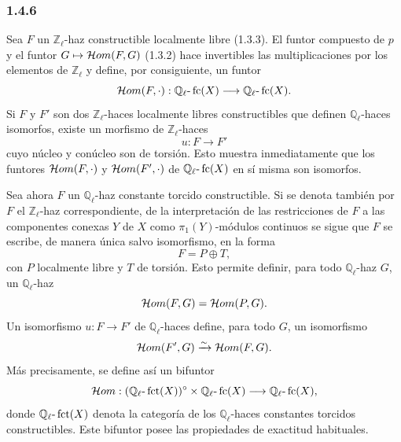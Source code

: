 \subsubsection*{1.4.6}
Sea \(F\) un \(\mathbb Z_\ell\)-haz constructible localmente libre (1.3.3). El funtor compuesto de \(p\) y el funtor \(G\mapsto\mathcal{H}om(F,G)\) (1.3.2) hace invertibles las multiplicaciones por los elementos de \(\mathbb Z_\ell\) y define, por consiguiente, un funtor
\[
\mathcal{H}om(F,\cdot):\mathbb Q_\ell\text{-}\operatorname{fc}(X)\longrightarrow \mathbb Q_\ell\text{-}\operatorname{fc}(X).
\]
Si \(F\) y \(F'\) son dos \(\mathbb Z_\ell\)-haces localmente libres constructibles que definen \(\mathbb Q_\ell\)-haces isomorfos, existe un morfismo de \(\mathbb Z_\ell\)-haces
\[
u:F\longrightarrow F'
\]
cuyo núcleo y conúcleo son de torsión. Esto muestra inmediatamente que los funtores \(\mathcal{H}om(F,\cdot)\) y \(\mathcal{H}om(F',\cdot)\) de \(\mathbb Q_\ell\text{-}\operatorname{fc}(X)\) en sí misma son isomorfos.

Sea ahora \(F\) un \(\mathbb Q_\ell\)-haz constante torcido constructible. Si se denota también por \(F\) el \(\mathbb Z_\ell\)-haz correspondiente, de la interpretación de las restricciones de \(F\) a las componentes conexas \(Y\) de \(X\) como \(\pi_1(Y)\)-módulos continuos se sigue que \(F\) se escribe, de manera única salvo isomorfismo, en la forma
\[
F=P\oplus T,
\]
con \(P\) localmente libre y \(T\) de torsión. Esto permite definir, para todo \(\mathbb Q_\ell\)-haz \(G\), un \(\mathbb Q_\ell\)-haz
\[
\mathcal{H}om(F,G)=\mathcal{H}om(P,G).
\]
Un isomorfismo \(u:F\to F'\) de \(\mathbb Q_\ell\)-haces define, para todo \(G\), un isomorfismo
\[
\mathcal{H}om(F',G)\xrightarrow{\sim}\mathcal{H}om(F,G).
\]
Más precisamente, se define así un bifuntor
\[
\mathcal{H}om:(\mathbb Q_\ell\text{-}\operatorname{fct}(X))^\circ\times \mathbb Q_\ell\text{-}\operatorname{fc}(X)
\longrightarrow \mathbb Q_\ell\text{-}\operatorname{fc}(X),
\]
donde \(\mathbb Q_\ell\text{-}\operatorname{fct}(X)\) denota la categoría de los \(\mathbb Q_\ell\)-haces constantes torcidos constructibles. Este bifuntor posee las propiedades de exactitud habituales.
